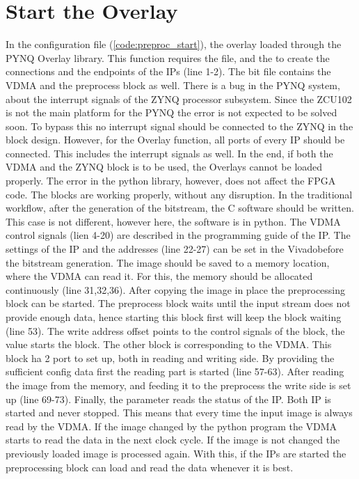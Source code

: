 \clearpage

\section{Start the Overlay} %
In the configuration file (\cref{code:preproc_start}), the overlay loaded through the PYNQ Overlay library.
This function requires the  file, and the  to create the connections and the endpoints of the IPs (line 1-2).
The bit file contains the VDMA and the preprocess block as well.
There is a bug in the PYNQ system, about the interrupt signals of the ZYNQ processor subsystem.
Since the ZCU102 is not the main platform for the PYNQ the error is not expected to be solved soon.
To bypass this no interrupt signal should be connected to the ZYNQ in the block design.
However, for the Overlay function, all ports of every IP should be connected.
This includes the interrupt signals as well.
In the end, if both the VDMA and the ZYNQ block is to be used, the Overlays cannot be loaded properly.
The error in the python library, however, does not affect the FPGA code.
The blocks are working properly, without any disruption.
In the traditional workflow, after the generation of the bitstream, the C software should be written.
This case is not different, however here, the software is in python.
The VDMA control signals (lien 4-20) are described in the programming guide of the IP.
The settings of the IP and the addresses (line 22-27) can be set in the Vivado\texttrademark before the bitstream generation.
The image should be saved to a memory location, where the VDMA can read it.
For this, the memory should be allocated continuously (line 31,32,36).
After copying the image in place the preprocessing block can be started.
The preprocess block waits until the input stream does not provide enough data, hence starting this block first will keep the block waiting (line 53).
The write address offset  points to the control signals of the block, the  value starts the block.
The other  block is corresponding to the VDMA.
This block ha 2 port to set up, both in reading and writing side.
By providing the sufficient config data first the reading part is started (line 57-63).
After reading the image from the memory, and feeding it to the preprocess the write side is set up (line 69-73).
Finally, the  parameter reads the status of the IP.
Both IP is started and never stopped.
This means that every time the input image is always read by the VDMA.
If the image changed by the python program the VDMA starts to read the data in the next clock cycle.
If the image is not changed the previously loaded image is processed again.
With this, if the IPs are started the preprocessing block can load and read the data whenever it is best.

